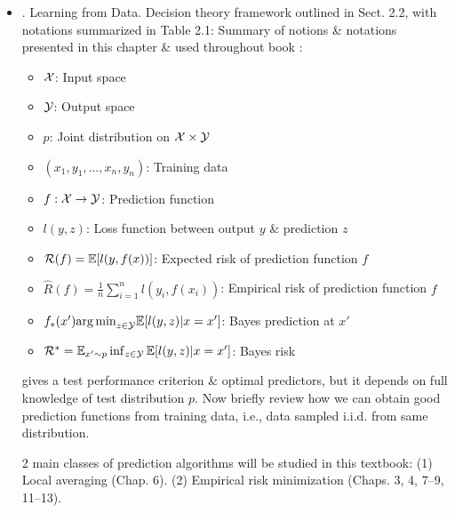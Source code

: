 \documentclass{article}
\newtheorem{problem}{Problem}
\begin{document}
\begin{enumerate}
\begin{itemize}
\begin{itemize}
\begin{itemize}
				\begin{problem}
					Consider a random prediction rule where predict from probability distribution of $y$ given $x$. When is this achieving Bayes risk?
				\end{problem}				
			\end{itemize}
			\item {. Learning from Data.} Decision theory framework outlined in Sect. 2.2, with notations summarized in {\sf Table 2.1: Summary of notions \& notations presented in this chapter \& used throughout book \cite{Bach2024}}:
			\begin{itemize}
				\item ${\cal X}$: Input space
				\item ${\cal Y}$: Output space
				\item $p$: Joint distribution on ${\cal X}\times{\cal Y}$
				\item $(x_1,y_1,\ldots,x_n,y_n)$: Training data
				\item $f:{\cal X}\to{\cal Y}$: Prediction function
				\item$l(y,z)$: Loss function between output $y$ \& prediction $z$
				\item ${\cal R}(f) = \mathbb{E}[l(y,f(x))]$: Expected risk of prediction function $f$
				\item $\widehat{R}(f) = \frac{1}{n}\sum_{i=1}^n l(y_i,f(x_i))$: Empirical risk of prediction function $f$
				\item $f_*(x') {\arg\min}_{z\in{\cal Y}} \mathbb{E}[l(y,z)|x = x']$: Bayes prediction at $x'$
				\item ${\cal R}^* = \mathbb{E}_{x'\sim p} \inf_{z\in{\cal Y}} \mathbb{E}[l(y,z)|x = x']$: Bayes risk
			\end{itemize}
			gives a test performance criterion \& optimal predictors, but it depends on full knowledge of test distribution $p$. Now briefly review how we can obtain good prediction functions from training data, i.e., data sampled i.i.d. from same distribution.
			
			2 main classes of prediction algorithms will be studied in this textbook: (1) Local averaging (Chap. 6). (2) Empirical risk minimization (Chaps. 3, 4, 7--9, 11--13).
			

\end{itemize}
\end{itemize}
\end{enumerate}
\end{document}
